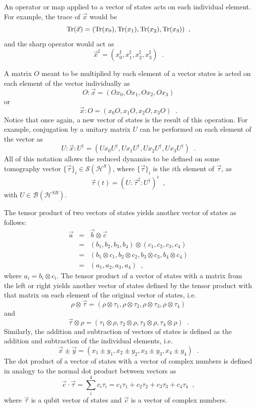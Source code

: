 An operator or map applied to a vector of states acts on each individual element.  For example, the trace of $\vec{x}$ would be
$$
\operatorname{Tr}(\vec{x}) = (\operatorname{Tr}(x_0),\operatorname{Tr}(x_1),\operatorname{Tr}(x_2),\operatorname{Tr}(x_3))\;\;,
$$
and the sharp operator would act as
$$
\vec{x}^\sharp = (x_0^\sharp,x_1^\sharp,x_2^\sharp,x_3^\sharp)\;\;.
$$

A matrix $O$ meant to be multiplied by each element of a vector states is acted on each element of the vector individually as
$$
O:\vec{x} = (Ox_0,Ox_1,Ox_2,Ox_3)
$$
or
$$
\vec{x}: O = (x_0 O,x_1 O,x_2 O,x_3 O)\;\;.
$$
Notice that once again, a new vector of states is the result of this operation.  For example, conjugation by a unitary matrix $U$ can be performed on each element of the vector as
$$
U:\vec{x}: U^\dagger = (Ux_0U^\dagger,Ux_1U^\dagger,Ux_2U^\dagger,Ux_3U^\dagger)\;\;.
$$
All of this notation allows the reduced dynamics to be defined on some tomography vector $\{\vec{\tau}\}_i\in\mathcal{S}(\mathcal{H}^S)$, where $\{\vec{\tau}\}_i$ is the $i$th element of $\vec{\tau}$, as
$$
\vec{\tau}(t) = (U:\vec{\tau}^\sharp:U^\dagger)^\flat\;\;,
$$
with $U\in\mathcal{B}(\mathcal{H}^{SB})$.

The tensor product of two vectors of states yields another vector of states as follows:
\begin{eqnarray*}
\vec{a} &=& \vec{b}\otimes\vec{c}\\
&=& \left(b_1,b_2,b_3,b_4\right)\otimes\left(c_1,c_2,c_3,c_4\right)\\
&=& \left(b_1\otimes c_1, b_2\otimes c_2, b_3\otimes c_3, b_4\otimes c_4\right)\\
&=& \left(a_1,a_2,a_3,a_4\right)\;\;,
\end{eqnarray*}
where $a_i=b_i\otimes c_i$.  The tensor product of a vector of states with a matrix from the left or right yields another vector of states defined by the tensor product with that matrix on each element of the original vector of states, i.e.\
$$
\rho\otimes \vec{\tau} = \left(\rho\otimes\tau_1,\rho\otimes\tau_2,\rho\otimes\tau_3,\rho\otimes\tau_4\right)
$$
and 
$$
\vec{\tau}\otimes\rho = \left(\tau_1\otimes\rho,\tau_2\otimes\rho,\tau_3\otimes\rho,\tau_4\otimes\rho\right)\;\;.
$$
Similarly, the addition and subtraction of vectors of states is defined as the addition and subtraction of the individual elements, i.e.
$$
\vec{x}\pm\vec{y} = \left(x_1\pm y_1,x_2\pm y_2,x_3\pm y_3,x_4\pm y_4\right)\;\;.
$$
The dot product of a vector of states with a vector of complex numbers is defined in analogy to the normal dot product between vectors as
$$
\vec{c}\cdot\vec{\tau} = \sum_i^4 c_i\tau_i = c_1\tau_1+c_2\tau_2+c_3\tau_3+c_4\tau_4\;\;,
$$
where $\vec{\tau}$ is a qubit vector of states and $\vec{c}$ is a vector of complex numbers.

